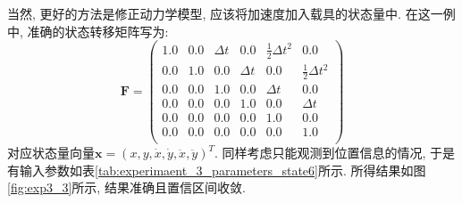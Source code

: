 \documentclass[12pt]{article}
\begin{document}
当然, 更好的方法是修正动力学模型, 应该将加速度加入载具的状态量中. 在这一例中, 准确的状态转移矩阵写为:
\begin{equation*}
\bm{F} =    
   \begin{pmatrix} %
      1.0 & 0.0 & \Delta t & 0.0 & \frac{1}{2} \Delta t^2 & 0.0 \\
      0.0 & 1.0 & 0.0 & \Delta t & 0.0 & \frac{1}{2} \Delta t^2 \\
      0.0 & 0.0 & 1.0 & 0.0 & \Delta t & 0.0 \\
      0.0 & 0.0 & 0.0 & 1.0 & 0.0 & \Delta t \\
      0.0 & 0.0 & 0.0 & 0.0 & 1.0 & 0.0 \\
      0.0 & 0.0 & 0.0 & 0.0 & 0.0 & 1.0 \\
   \end{pmatrix}
\end{equation*}
对应状态量向量$\bm{x} = (x, y, \dot{x}, \dot{y}, \ddot{x}, \ddot{y})^T$. 同样考虑只能观测到位置信息的情况, 于是有输入参数如表\ref{tab:experimaent_3_parameters_state6}所示. 所得结果如图\ref{fig:exp3_3}所示, 结果准确且置信区间收敛. 
\end{document}
